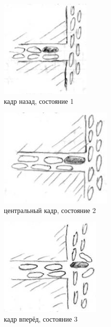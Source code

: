 \documentclass[11pt]{article}
\begin{document}

\begin{figure}
\centering
\includegraphics{clip_image002.jpg}
\caption{кадр назад, состояние 1}
\end{figure}


\begin{figure}
\centering
\includegraphics{clip_image004.jpg}
\caption{центральный кадр, состояние 2}
\end{figure}


\begin{figure}
\centering
\includegraphics{clip_image006.jpg}
\caption{кадр вперёд, состояние 3}
\end{figure}
\end{document}
